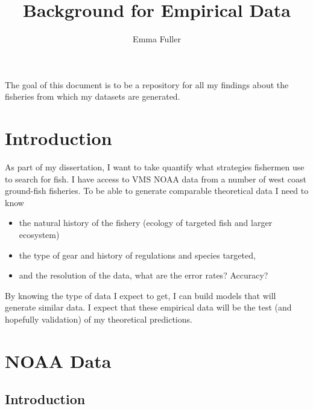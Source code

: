 \documentclass[12pt, a4paper]{article}
\title{Background for Empirical Data}
\author{Emma Fuller}
\date{} 	%
\begin{document}
\maketitle

\noindent The goal of this document is to be a repository for all my findings about the fisheries from which my datasets are generated.


\tableofcontents


\section{Introduction}
As part of my dissertation, I want to take quantify what strategies fishermen use to search for fish. I  have access to VMS  NOAA data from a number of west coast ground-fish fisheries. To be able to generate comparable theoretical data I need to know 

\begin{itemize}
\item the natural history of the fishery (ecology of targeted fish and larger ecosystem) 
\item the type of gear and history of regulations and species targeted, 
\item and the resolution of the data, what are the error rates? Accuracy?
\end{itemize}

\noindent By knowing the type of data I expect to get, I can build models that will generate similar data. I expect that these empirical data will be the test (and hopefully validation) of my theoretical predictions. 


\section{NOAA Data}

\subsection{Introduction}




\end{document}

